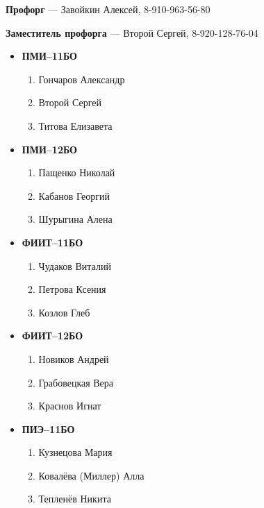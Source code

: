 
\par \textbf{Профорг} --- Завойкин Алексей, 8-910-963-56-80\\
\par \textbf{Заместитель профорга} --- Второй Сергей, 8-920-128-76-04




\begin{itemize}
\item \textbf{ПМИ--11БО}
	\begin{enumerate}
	\item Гончаров Александр
	\item Второй Сергей
	\item Титова Елизавета
	\end{enumerate}
\item \textbf{ПМИ--12БО}
	\begin{enumerate}
	\item Пащенко Николай
	\item Кабанов Георгий
	\item Шурыгина Алена
	\end{enumerate}
\item \textbf{ФИИТ--11БО}
	\begin{enumerate}
	\item Чудаков Виталий
	\item Петрова Ксения
	\item Козлов Глеб
	\end{enumerate}
\item \textbf{ФИИТ--12БО}
	\begin{enumerate}
	\item Новиков Андрей
	\item Грабовецкая Вера
	\item Краснов Игнат
	\end{enumerate}
\item \textbf{ПИЭ--11БО}
	\begin{enumerate}
	\item Кузнецова Мария
	\item Ковалёва (Миллер) Алла
	\item Тепленёв Никита
	\end{enumerate}
\end{itemize}



